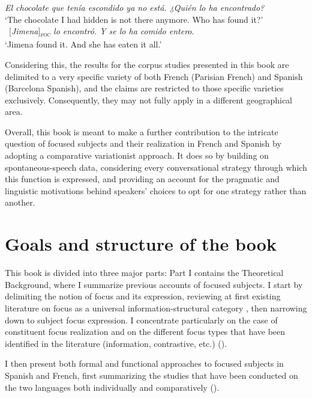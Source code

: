 \ea \label{ex:intro:11}
\ea \textit{El chocolate que tenía escondido ya no está. ¿Quién lo ha encontrado?}\\
 ‘The chocolate I had hidden is not there anymore. Who has found it?'
\ex \ {[\textit{Jimena}}]\textsubscript{\textsc{foc}} \normalsize \textit{lo encontró. Y se lo ha comido entero}.\\
`Jimena found it. And she has eaten it all.' \\
\hfill \parencite[6]{jimenez2015focus}
\z \z 


Considering this, the results for the corpus studies presented in this book are delimited to a very specific variety of both French (Parisian French) and Spanish (Barcelona Spanish), and the claims are restricted to those specific varieties exclusively. Consequently, they may not fully apply in a different geographical area. 

Overall, this book is meant to make a further contribution to the intricate question of focused subjects and their realization in French and Spanish by adopting a comparative variationist approach. It does so by building on spontaneous-speech data, considering every conversational strategy through which this function is expressed, and providing an account for the pragmatic and linguistic motivations behind speakers' choices to opt for one strategy rather than another.


\section{Goals and structure of the book} \label{sub:1.2} 

This book is divided into three major parts: Part I contains the Theoretical Background, where I summarize previous accounts of focused subjects. I start by delimiting the notion of focus and its expression, reviewing at first existing literature on focus as a universal information-structural category
\parencite{zimmermann2011focus}, then narrowing down to subject focus expression. I concentrate particularly on the case of constituent focus realization and on the different focus types that have been identified in the literature (information, contrastive, etc.) (\textsc{}).

I then present both formal and functional approaches to focused subjects in Spanish and French, first summarizing the studies that have been conducted on the two languages both individually and comparatively (\textsc{}).

